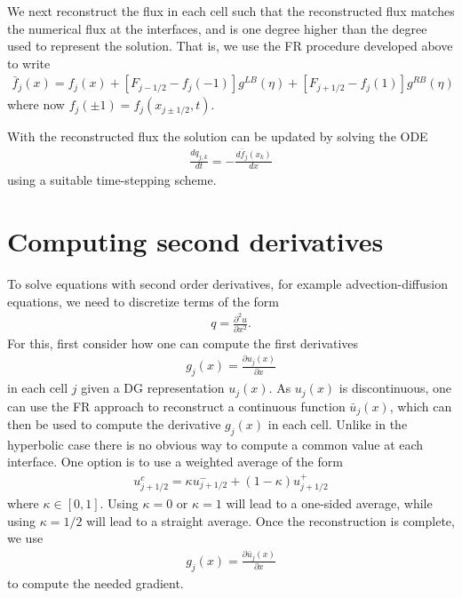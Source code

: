 \documentclass[11pt, reqno]{amsart}
\theoremstyle{definition}
\begin{document}
We next reconstruct the flux in each cell such that the reconstructed
flux matches the numerical flux at the interfaces, and is one degree
higher than the degree used to represent the solution. That is, we use
the FR procedure developed above to write
\begin{align}\label{eq:flux_recon}
  \bar{f}_j(x)
  =
  f_j(x)
  +
  [F_{j-1/2} - f_j(-1)]g^{LB}(\eta)
  +
  [F_{j+1/2} - f_j(1)]g^{RB}(\eta)
\end{align}
where now $f_j(\pm 1) = f_j(x_{j\pm 1/2},t)$.

With the reconstructed flux the solution can be updated by solving the
ODE
\begin{align}
  \frac{d q_{j,k}}{dt} = -\frac{d\bar{f}_j(x_k)}{dx}
\end{align}
using a suitable time-stepping scheme.

\section{Computing second derivatives}

To solve equations with second order derivatives, for example
advection-diffusion equations, we need to discretize terms of the form
\begin{align}
  q = \frac{\partial^2 u}{\partial x^2}.
\end{align}
For this, first consider how one can compute the first derivatives
\begin{align}
  g_j(x) = \frac{\partial u_j(x)}{\partial x}
\end{align}
in each cell $j$ given a DG representation $u_j(x)$. As $u_j(x)$ is
discontinuous, one can use the FR approach to reconstruct a continuous
function $\bar{u}_j(x)$, which can then be used to compute the
derivative $g_j(x)$ in each cell. Unlike in the hyperbolic case there
is no obvious way to compute a common value at each interface. One
option is to use a weighted average of the form
\begin{align}\label{eq:ucomm}
  u^c_{j+1/2} = \kappa u_{j+1/2}^-
  +
  (1-\kappa) u_{j+1/2}^+
\end{align}
where $\kappa \in [0,1]$. Using $\kappa=0$ or $\kappa=1$ will lead to
a one-sided average, while using $\kappa=1/2$ will lead to a straight
average. Once the reconstruction is complete, we use
\begin{align}
  g_j(x) = \frac{\partial \bar{u}_j(x)}{\partial x}
\end{align}
to compute the needed gradient.
\end{document}
